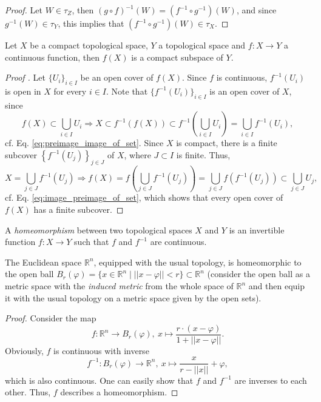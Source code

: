 \begin{proof}
	Let $W\in\tau_Z$, then $(g\circ f)^{-1}(W) = (f^{-1}\circ g^{-1})(W)$, and since $g^{-1}(W)\in \tau_Y$, this implies that $(f^{-1}\circ g^{-1})(W)\in\tau_X$.
\end{proof}

\begin{theorem}\label{thrm:image_of_cont_func_on_comp_top_space_is_compact}
	Let $X$ be a compact topological space, $Y$ a topological space and $f: X\to Y$ a continuous function, then $f(X)$ is a compact subspace of $Y$.
\end{theorem}

\begin{proof}[Proof \cite{226328}]
	Let $\{U_i\}_{i\in I}$ be an open cover of $f(X)$. Since $f$ is continuous, $f^{-1}(U_i)$ is open in $X$ for every $i\in I$. Note that $\{f^{-1}(U_i)\}_{i\in I}$ is an open cover of $X$, since  $$f(X)\subset \bigcup_{i\in I}U_i\Rightarrow X\subset f^{-1}(f(X))\subset f^{-1}\left(\bigcup_{i\in I}U_i\right) = \bigcup_{i\in I}f^{-1}(U_i),$$ cf. Eq. \eqref{eq:preimage_image_of_set}. Since $X$ is compact, there is a finite subcover $\left\{f^{-1}(U_j)\right\}_{j\in J}$ of $X$, where $J\subset I$ is finite. Thus,
	$$X = \bigcup_{j\in J}f^{-1}(U_j)\Rightarrow f(X) = f\left(\bigcup_{j\in J}f^{-1}(U_j)\right) = \bigcup_{j\in J}f(f^{-1}(U_j))\subset \bigcup_{j\in J}U_j,$$
	cf. Eq. \eqref{eq:image_preimage_of_set}, which shows that every open cover of $f(X)$ has a finite subcover.
\end{proof}

\begin{defn} A \textit{homeomorphism} between two topological spaces $X$ and $Y$ is an invertible function $f: X\rightarrow Y$ such that $f$ and $f^{-1}$ are continuous. 
\end{defn}

\begin{exmp}
	The Euclidean space $\mathbb R^n$, equipped with the usual topology, is homeomorphic to the open ball $B_{r}(\varphi) =  \{x\in\mathbb R^n \mid \lvert\lvert x-\varphi \rvert\rvert < r \} \subset \mathbb R^n$ (consider the open ball as a metric space with the \textit{induced metric} from the whole space of $\mathbb R^n$ and then equip it with the usual topology on a metric space given by the open sets). 
\end{exmp}

\begin{proof}
	Consider the map $$f: \mathbb R^n\rightarrow B_r(\varphi), \ x\mapsto \frac{r\cdot (x-\varphi)}{1+\lvert\lvert x-\varphi\rvert\rvert}.$$ Obviously, $f$ is continuous with inverse $$f^{-1}: B_r(\varphi)\rightarrow \mathbb R^n, \ x \mapsto \frac{x}{r-\lvert\lvert x\rvert\rvert}+\varphi,$$ which is also continuous. One can easily show that $f$ and $f^{-1}$ are inverses to each other. Thus, $f$ describes a homeomorphism. 	
\end{proof}

